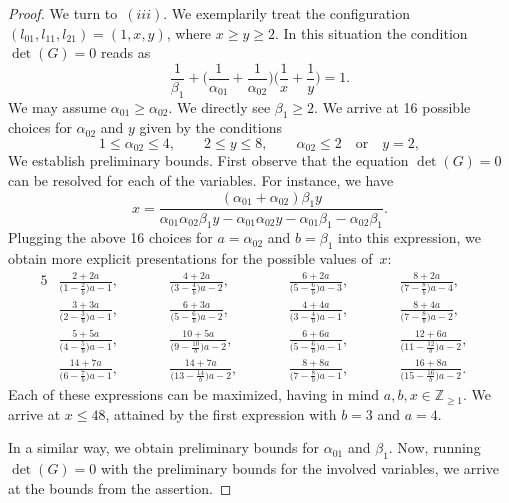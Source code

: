 \documentclass[10pt,a4paper]{amsart}
\theoremstyle{definition}
\def\ZZ{{\mathbb Z}}
\numberwithin{equation}{section}
\begin{document}
\begin{proof}
We turn to~$(iii)$. We exemplarily treat the
configuration $(l_{01},l_{11},l_{21}) = (1,x,y)$,
where $x \ge y \ge 2$.
In this situation the condition $\det(G) = 0$
reads as
\begin{equation*}
\frac{1}{\beta_1}+
\bigg( \frac{1}{\alpha_{01}} + \frac{1}{\alpha_{02}} \bigg)
\bigg( \frac{1}{x} + \frac{1}{y} \bigg) =1.
\end{equation*}
We may assume $\alpha_{01} \ge \alpha_{02}$. We directly see $\beta_1 \ge 2$.
We arrive at 16 possible choices for
$\alpha_{02}$ and $y$ given by the conditions
\[
1 \le \alpha_{02} \le 4,\qquad
2 \le y \le 8,\qquad
\alpha_{02} \le 2\quad \text{or}\quad y = 2,
\]
We establish preliminary bounds.
First observe that the equation $\det(G) = 0$ can
be resolved for each of the variables.
For instance, we have
\[
x
 =
\frac{(\alpha_{01} + \alpha_{02})\beta_1 y}{\alpha_{01} \alpha_{02} \beta_1 y - \alpha_{01} \alpha_{02} y - \alpha_{01} \beta_1 - \alpha_{02} \beta_1} .
\]
Plugging the above 16 choices for $a = \alpha_{02}$
and $b = \beta_1$ into this expression, we obtain more
explicit presentations for the possible values of~$x$:
\begin{alignat*}{5}
&\frac{2 + 2a}{\big(1 - \frac{2}{b}\big) a - 1},\qquad&&
\frac{4 + 2a}{\big(3 - \frac{4}{b}\big) a - 2},\qquad&&
\frac{6 + 2a}{\big(5 - \frac{6}{b}\big) a - 3},\qquad&&
\frac{8 + 2a}{\big(7 - \frac{8}{b}\big) a - 4},&
\\
&\frac{3 + 3a}{\big(2 - \frac{3}{b}\big) a - 1},\qquad&&
\frac{6 + 3a}{\big(5 - \frac{6}{b}\big) a - 2},\qquad&&
\frac{4 + 4a}{\big(3 - \frac{4}{b}\big) a - 1},\qquad&&
\frac{8 + 4a}{\big(7 - \frac{8}{b}\big) a - 2},&
\\
&\frac{5 + 5a}{\big(4 - \frac{5}{b}\big) a - 1},\qquad&&
\frac{10 + 5a}{\big(9 - \frac{10}{b}\big) a - 2},\qquad&&
\frac{6 + 6a}{\big(5 - \frac{6}{b}\big) a - 1},\qquad&&
\frac{ 12 + 6a}{\big(11 - \frac{12}{b}\big) a - 2},&
\\
&\frac{14 + 7a}{\big(6 - \frac{7}{b}\big) a - 1},\qquad&&
\frac{14 + 7 a}{\big(13 - \frac{14}{b}\big) a - 2},\qquad&&
\frac{8 + 8 a}{\big(7 - \frac{8}{b}\big) a - 1},\qquad&&
\frac{16 + 8 a}{\big(15 - \frac{16}{b}\big) a - 2}.&
\end{alignat*}
Each of these expressions can be maximized,
having in mind $a,b,x \in \ZZ_{\ge 1}$.
We arrive at $x \le 48$, attained by the first
expression with $b=3$ and $a=4$.

In a similar way, we obtain preliminary bounds for
$\alpha_{01}$ and $\beta_1$.
Now, running $\det(G)=0$ with the preliminary
bounds for the involved variables, we arrive at
the bounds from the assertion.
\end{proof}
\end{document}
